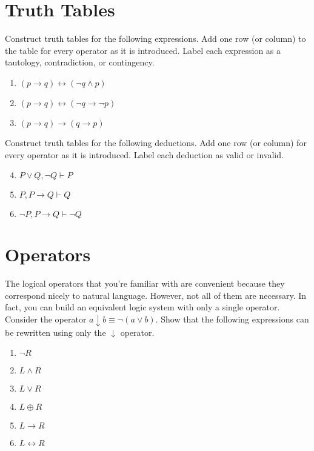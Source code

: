 \documentclass{article}
\begin{document}
\section{Truth Tables}

Construct truth tables for the following expressions.
Add one row (or column) to the table for every operator as it is introduced.
Label each expression as a tautology, contradiction, or contingency.

\begin{enumerate}[label=\textbf{\alph*.}]
    \item $(p \rightarrow q) \leftrightarrow (\neg q \wedge p)$
    \item $(p \rightarrow q) \leftrightarrow (\neg q \rightarrow \neg p)$
    \item $(p \rightarrow q) \rightarrow (q \rightarrow p)$
\end{enumerate}

\noindent
Construct truth tables for the following deductions.
Add one row (or column) for every operator as it is introduced.
Label each deduction as valid or invalid.

\begin{enumerate}[label=\textbf{\alph*.}]
    \setcounter{enumi}{3}
    \item $P \vee Q, \neg Q \vdash P$
    \item $P, P \rightarrow Q \vdash Q$
    \item $\neg P, P \rightarrow Q \vdash \neg Q$
\end{enumerate}


\section{Operators}

The logical operators that you're familiar with are convenient because they correspond nicely to natural language.
However, not all of them are necessary.
In fact, you can build an equivalent logic system with only a single operator.
Consider the operator $a \downarrow b \equiv \neg(a \vee b)$.
Show that the following expressions can be rewritten using only the $\downarrow$ operator.

\begin{enumerate}[label=\textbf{\alph*.}]
    \setlength{\itemsep}{0pt}
    \item $\neg R$
    \item $L \wedge R$
    \item $L \vee R$
    \item $L \oplus R$
    \item $L \rightarrow R$
    \item $L \leftrightarrow R$
\end{enumerate}
\end{document}
